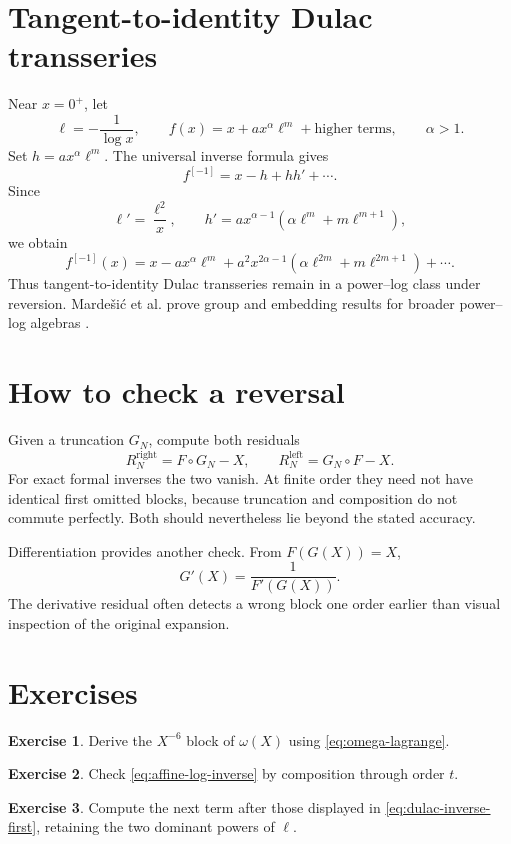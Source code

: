 \documentclass[11pt,openany]{book}
\theoremstyle{definition}
\newtheorem{exercise}{Exercise}[chapter]
\theoremstyle{plain}
\theoremstyle{remark}
\newcommand{\invcomp}{^{[-1]}}
\begin{document}
\section{Tangent-to-identity Dulac transseries}
Near \(x=0^+\), let
\[
 \ell=-\frac1{\log x},
 \qquad
 f(x)=x+a x^\alpha\ell^m+\text{higher terms},
 \qquad \alpha>1.
\]
Set \(h=a x^\alpha\ell^m\). The universal inverse formula gives
\[
 f\invcomp=x-h+hh'+\cdots.
\]
Since
\[
 \ell'=\frac{\ell^2}{x},
 \qquad
 h'=a x^{\alpha-1}
 \left(\alpha\ell^m+m\ell^{m+1}\right),
\]
we obtain
\begin{equation}\label{eq:dulac-inverse-first}
 f\invcomp(x)
 =x-a x^\alpha\ell^m
 +a^2x^{2\alpha-1}
 \left(\alpha\ell^{2m}+m\ell^{2m+1}\right)
 +\cdots.
\end{equation}
Thus tangent-to-identity Dulac transseries remain in a power--log class under reversion. Marde\v{s}i\'c et al. prove group and embedding results for broader power--log algebras \cite{mardesic-normalforms}.

\section{How to check a reversal}
Given a truncation \(G_N\), compute both residuals
\begin{equation}\label{eq:two-residuals}
 R_N^{\mathrm{right}}=F\circ G_N-X,
 \qquad
 R_N^{\mathrm{left}}=G_N\circ F-X.
\end{equation}
For exact formal inverses the two vanish. At finite order they need not have identical first omitted blocks, because truncation and composition do not commute perfectly. Both should nevertheless lie beyond the stated accuracy.

Differentiation provides another check. From \(F(G(X))=X\),
\begin{equation}\label{eq:inverse-derivative-check}
 G'(X)=\frac1{F'(G(X))}.
\end{equation}
The derivative residual often detects a wrong block one order earlier than visual inspection of the original expansion.

\section{Exercises}
\begin{exercise}
Derive the \(X^{-6}\) block of \(\omega(X)\) using \cref{eq:omega-lagrange}.
\end{exercise}
\begin{exercise}
Check \cref{eq:affine-log-inverse} by composition through order \(t\).
\end{exercise}
\begin{exercise}
Compute the next term after those displayed in \cref{eq:dulac-inverse-first}, retaining the two dominant powers of \(\ell\).
\end{exercise}
\end{document}
